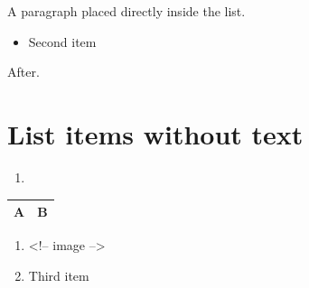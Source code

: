 \documentclass[11pt,a4paper]{article}
\begin{document}
A paragraph placed directly inside the list.

\begin{itemize}
\item Second item
\end{itemize}

After.

\section{List items without text}

\begin{enumerate}
\item 
\end{enumerate}

\begin{table}[h]
\begin{tabular}{|l|l|}
\hline
A & B \\ \hline
\end{tabular}
\end{table}

\begin{enumerate}
\item 
<!-- image -->
\item Third item
\end{enumerate}
\end{document}

